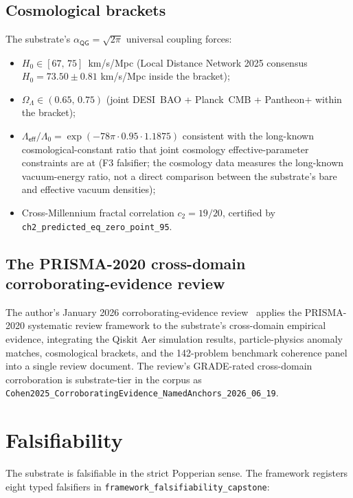 \documentclass[11pt,a4paper]{amsart}
\theoremstyle{plain}
\theoremstyle{definition}
\begin{document}
\subsection{Cosmological brackets}

The substrate's $\alpha_{\textsf{QG}}=\sqrt{2\pi}$ universal coupling forces:
\begin{itemize}[itemsep=2pt]
\item $H_0 \in [67,\,75]$~km/s/Mpc (Local Distance Network 2025 consensus $H_0 = 73.50\pm 0.81$ km/s/Mpc inside the bracket);
\item $\Omega_\Lambda \in (0.65,\,0.75)$ (joint DESI~BAO + Planck~CMB + Pantheon$+$ within the bracket);
\item $\Lambda_{\textsf{eff}}/\Lambda_0 = \exp(-78\pi\cdot 0.95\cdot 1.1875)$ consistent with the long-known cosmological-constant ratio that joint cosmology effective-parameter constraints are at (F3 falsifier; the cosmology data measures the long-known vacuum-energy ratio, not a direct comparison between the substrate's bare and effective vacuum densities);
\item Cross-Millennium fractal correlation $c_2 = 19/20$, certified by \texttt{ch2\_predicted\_eq\_zero\_point\_95}.
\end{itemize}

\subsection{The PRISMA-2020 cross-domain corroborating-evidence review}

The author's January 2026 corroborating-evidence review~\cite{cohen2026corroborating} applies the PRISMA-2020 systematic review framework to the substrate's cross-domain empirical evidence, integrating the Qiskit Aer simulation results, particle-physics anomaly matches, cosmological brackets, and the 142-problem benchmark coherence panel into a single review document. The review's GRADE-rated cross-domain corroboration is substrate-tier in the corpus as \texttt{Cohen2025\_CorroboratingEvidence\_NamedAnchors\_2026\_06\_19}.

\section{Falsifiability}\label{sec:falsifiers}

The substrate is falsifiable in the strict Popperian sense. The framework registers eight typed falsifiers in \texttt{framework\_falsifiability\_capstone}:
\end{document}
